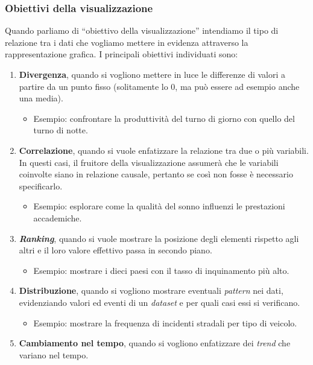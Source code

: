 \subsubsection{Obiettivi della visualizzazione}\label{subsubsec:obj}
Quando parliamo di ``obiettivo della visualizzazione'' intendiamo il tipo di relazione tra i dati che vogliamo mettere in evidenza attraverso
la rappresentazione grafica. I principali obiettivi individuati sono:
\begin{enumerate}
    \item \textbf{Divergenza}, quando si vogliono mettere in luce le differenze di valori a partire da un punto fisso (solitamente lo 0, ma può essere
    ad esempio anche una media).
    \begin{itemize}
        \item Esempio: confrontare la produttività del turno di giorno con quello del turno di notte.
    \end{itemize}
    \item \textbf{Correlazione}, quando si vuole enfatizzare la relazione tra due o più variabili. In questi casi, il fruitore della visualizzazione assumerà che le 
    variabili coinvolte siano in relazione causale, pertanto se così non fosse è necessario specificarlo.
    \begin{itemize}
        \item Esempio: esplorare come la qualità del sonno influenzi le prestazioni accademiche.
    \end{itemize}
    \item \textbf{\emph{Ranking}}, quando si vuole mostrare la posizione degli elementi rispetto agli altri e il loro valore effettivo passa in secondo piano.
    \begin{itemize}
        \item Esempio: mostrare i dieci paesi con il tasso di inquinamento più alto.
    \end{itemize}
    \item \textbf{Distribuzione}, quando si vogliono mostrare eventuali \emph{pattern} nei dati, evidenziando valori ed eventi di un \emph{dataset} e per quali casi essi si verificano. 
    \begin{itemize}
        \item Esempio: mostrare la frequenza di incidenti stradali per tipo di veicolo.
    \end{itemize}
    \item \textbf{Cambiamento nel tempo}, quando si vogliono enfatizzare dei \emph{trend} che variano nel tempo.

\end{enumerate}
